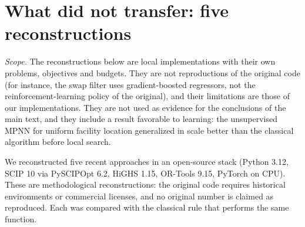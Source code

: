 \section{What did not transfer: five reconstructions}\label{app:reconstructions}
\noindent\emph{Scope.} The reconstructions below are local implementations with their own
problems, objectives and budgets. They are not reproductions of the original code (for instance,
the swap filter uses gradient-boosted regressors, not the reinforcement-learning policy of the
original), and their limitations are those of our implementations. They are not used as evidence
for the conclusions of the main text, and they include a result favorable to learning: the
unsupervised MPNN for uniform facility location generalized in scale better than the classical
algorithm before local search.


We reconstructed five recent approaches in an open-source stack (Python 3.12, SCIP 10 via
PySCIPOpt 6.2, HiGHS 1.15, OR-Tools 9.15, PyTorch on CPU). These are methodological
reconstructions: the original code requires historical environments or commercial licenses, and
no original number is claimed as reproduced. Each was compared with the classical rule that
performs the same function.

